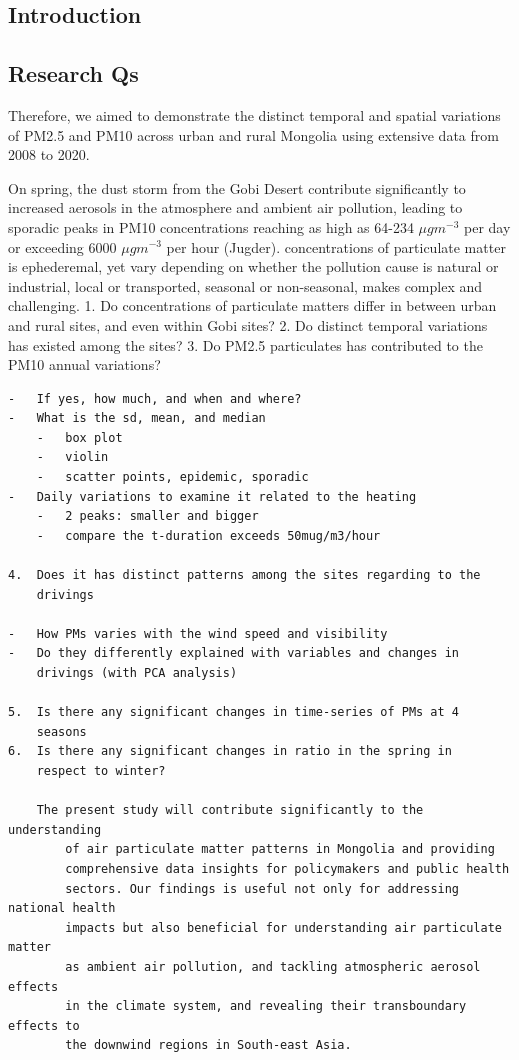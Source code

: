 \documentclass[
  11pt,
]{article}
\begin{document}
\subsection{Introduction}\label{introduction}

\subsection{Research Qs}\label{research-qs}

Therefore, we aimed to demonstrate the distinct temporal and spatial
variations of PM2.5 and PM10 across urban and rural Mongolia using
extensive data from 2008 to 2020.

On spring, the dust storm from the Gobi Desert contribute significantly
to increased aerosols in the atmosphere and ambient air pollution,
leading to sporadic peaks in PM10 concentrations reaching as high as
64-234 \(\mu g m^{-3}\) per day or exceeding 6000 \(\mu g m^{-3}\) per
hour (Jugder). concentrations of particulate matter is ephederemal, yet
vary depending on whether the pollution cause is natural or industrial,
local or transported, seasonal or non-seasonal, makes complex and
challenging. 1. Do concentrations of particulate matters differ in
between urban and rural sites, and even within Gobi sites? 2. Do
distinct temporal variations has existed among the sites? 3. Do PM2.5
particulates has contributed to the PM10 annual variations?

\begin{verbatim}
-   If yes, how much, and when and where?
-   What is the sd, mean, and median
    -   box plot
    -   violin
    -   scatter points, epidemic, sporadic
-   Daily variations to examine it related to the heating
    -   2 peaks: smaller and bigger
    -   compare the t-duration exceeds 50mug/m3/hour

4.  Does it has distinct patterns among the sites regarding to the
    drivings

-   How PMs varies with the wind speed and visibility
-   Do they differently explained with variables and changes in
    drivings (with PCA analysis)

5.  Is there any significant changes in time-series of PMs at 4
    seasons
6.  Is there any significant changes in ratio in the spring in
    respect to winter?

    The present study will contribute significantly to the understanding
        of air particulate matter patterns in Mongolia and providing
        comprehensive data insights for policymakers and public health
        sectors. Our findings is useful not only for addressing national health
        impacts but also beneficial for understanding air particulate matter
        as ambient air pollution, and tackling atmospheric aerosol effects
        in the climate system, and revealing their transboundary effects to
        the downwind regions in South-east Asia.
\end{verbatim}
\end{document}
